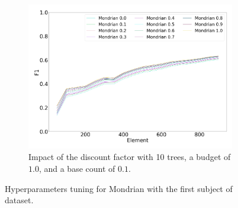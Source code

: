 \begin{figure}
\begin{subfigure}[b]{0.49\textwidth}
		 \centering
		 \includegraphics[width=\textwidth]{figures/calibration_mondrian_discount.png}
		 \caption{Impact of the discount factor with 10 trees, a budget of $1.0$, and a base count of $0.1$.}
		 \label{fig:mondrian-discount}
	 \end{subfigure}
		\caption{Hyperparameters tuning for Mondrian with the first subject of \banosdataset dataset.}
		\label{fig:mondrian-tuning}
\end{figure}

